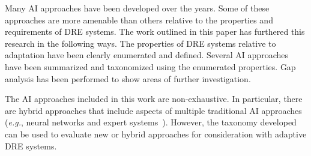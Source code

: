 \documentclass[conference]{IEEEtran}
\begin{document}
Many AI approaches have been developed over the years. Some of these approaches are more amenable than others relative to the properties and requirements of DRE systems. The work outlined in this paper has furthered this research in the following ways. The properties of DRE systems relative to adaptation have been clearly enumerated and defined. Several AI approaches have been summarized and taxonomized using the enumerated properties. Gap analysis has been performed to show areas of further investigation.

The AI approaches included in this work are non-exhaustive. In particular, there are hybrid approaches that include aspects of multiple traditional AI approaches (\emph{e.g.}, neural networks and expert systems~\cite{Sahin:2012}). However, the taxonomy developed can be used to evaluate new or hybrid approaches for consideration with adaptive DRE systems.

% 

{

}
\end{document}
